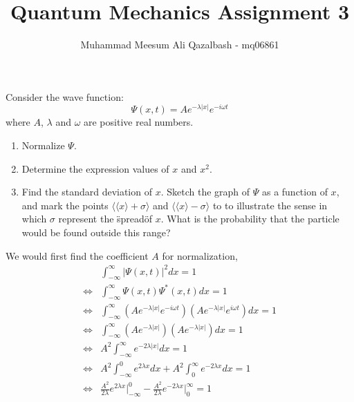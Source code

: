 \documentclass[addpoints]{exam}
\title{Quantum Mechanics Assignment 3}
\author{Muhammad Meesum Ali Qazalbash - mq06861}
\date{}
\begin{document}
\maketitle
\begin{questions}
    \question[15] Consider the wave function:
    \[\Psi(x,t)=Ae^{-\lambda|x|}e^{-i\omega t}\]
    where $A$, $\lambda$ and $\omega$ are positive real numbers.
    \begin{enumerate}
        \item Normalize $\Psi$.
        \item Determine the expression values of $x$ and $x^2$.
        \item Find the standard deviation of $x$. Sketch the graph of $\Psi$ as a function of $x$, and mark the points $\langle\langle x\rangle+\sigma\rangle$ and $\langle\langle x\rangle-\sigma\rangle$ to to illustrate the sense in which $\sigma$ represent the \"spread\" of $x$. What is the probability that the particle would be found outside this range?
    \end{enumerate}
    \begin{solution}
        We would first find the coefficient $A$ for normalization,
        \begin{align*}
                     & \int_{-\infty}^{\infty} {|\Psi(x,t)|}^2 dx                                                                            = 1              \\
            \iff     & \int_{-\infty}^{\infty} {\Psi(x,t)}{{\Psi}^{*}(x,t)} dx                                                               = 1              \\
            \iff     & \int_{-\infty}^{\infty} {\left(Ae^{-\lambda|x|}e^{-i\omega t}\right)}{\left(Ae^{-\lambda|x|}e^{i\omega t}\right)} dx  = 1              \\
            \iff     & \int_{-\infty}^{\infty} {\left(Ae^{-\lambda|x|}\right)}{\left(Ae^{-\lambda|x|}\right)} dx                             = 1              \\
            \iff     & A^2 \int_{-\infty}^{\infty} {e^{-2\lambda|x|}} dx                                                                     = 1              \\
            \iff     & A^2 \int_{-\infty}^{0} {e^{2\lambda x}} dx + A^2 \int_{0}^{\infty} {e^{-2\lambda x}} dx                               = 1              \\
            \iff     & \frac{A^2}{2\lambda}e^{2\lambda x}\Big|_{-\infty}^{0} - \frac{A^2}{2\lambda}e^{-2\lambda x}\Big|_{0}^{\infty}         = 1              \\

\end{align*}
\end{solution}
\end{questions}
\end{document}
